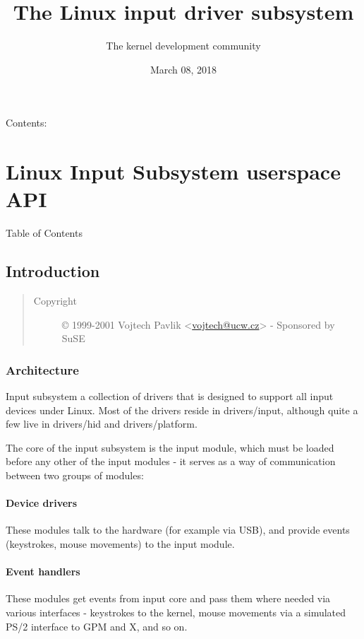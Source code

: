 \documentclass[a4paper,8pt,english]{sphinxmanual}
\title{The Linux input driver subsystem}
\date{March 08, 2018}
\author{The kernel development community}
\begin{document}
\maketitle
\tableofcontents
{}\label{input/index::doc}


Contents:


\chapter{Linux Input Subsystem userspace API}
\label{input/input_uapi:the-linux-input-documentation}\label{input/input_uapi::doc}\label{input/input_uapi:linux-input-subsystem-userspace-api}
Table of Contents


\section{Introduction}
\label{input/input:introduction}\label{input/input::doc}\begin{quote}\begin{description}
\item[{Copyright}] \leavevmode
© 1999-2001 Vojtech Pavlik \textless{}\href{mailto:vojtech@ucw.cz}{vojtech@ucw.cz}\textgreater{} - Sponsored by SuSE

\end{description}\end{quote}


\subsection{Architecture}
\label{input/input:architecture}
Input subsystem  a collection of drivers that is designed to support
all input devices under Linux. Most of the drivers reside in
drivers/input, although quite a few live in drivers/hid and
drivers/platform.

The core of the input subsystem is the input module, which must be
loaded before any other of the input modules - it serves as a way of
communication between two groups of modules:


\subsubsection{Device drivers}
\label{input/input:device-drivers}
These modules talk to the hardware (for example via USB), and provide
events (keystrokes, mouse movements) to the input module.


\subsubsection{Event handlers}
\label{input/input:event-handlers}
These modules get events from input core and pass them where needed
via various interfaces - keystrokes to the kernel, mouse movements via
a simulated PS/2 interface to GPM and X, and so on.
\end{document}
